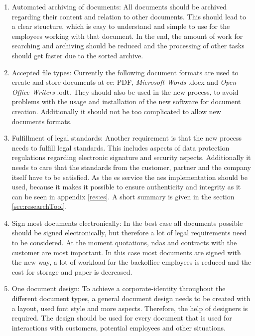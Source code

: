 \begin{enumerate}
	\item Automated archiving of documents: \newline
	All documents should be archived regarding their content and relation to other documents. This should lead to a clear structure, which is easy to understand and simple to use for the employees working with that document. In the end, the amount of work for searching and archiving should be reduced and the processing of other tasks should get faster due to the sorted archive.
	\item Accepted file types: \newline
	Currently the following document formats are used to create and store documents at \gls{cc}: \gls{PDF}, \textit{Microsoft Words} .docx and \textit{Open Office Writers} .odt. They should also be used in the new process, to avoid problems with the usage and installation of the new software for document creation. Additionally it should not be too complicated to allow new documents formats.
	\item Fulfillment of legal standards: \newline
	Another requirement is that the new process needs to fulfill legal standards. This includes aspects of data protection regulations regarding electronic signature and security aspects. Additionally it needs to care that the standards from the customer, partner and the company itself have to be satisfied. \newline
	As the \gls{es} service the \gls{aes} implementation should be used, because it makes it possible to ensure authenticity and integrity as it can be seen in appendix \ref{res:es}. A short summary is given in the section \ref{sec:researchTool}.
	\item Sign most documents electronically: \newline
	In the best case all documents possible should be signed electronically, but therefore a lot of legal requirements need to be considered. At the moment quotations, \glspl{nda} and contracts with the customer are most important. In this case most documents are signed with the new way, a lot of workload for the backoffice employees is reduced and the cost for storage and paper is decreased.
	\item One document design: \newline
	To achieve a corporate-identity throughout the different document types, a general document design needs to be created with a layout, used font style and more aspects. Therefore, the help of designers is required. The design should be used for every document that is used for interactions with customers, potential employees and other situations.

\end{enumerate}
